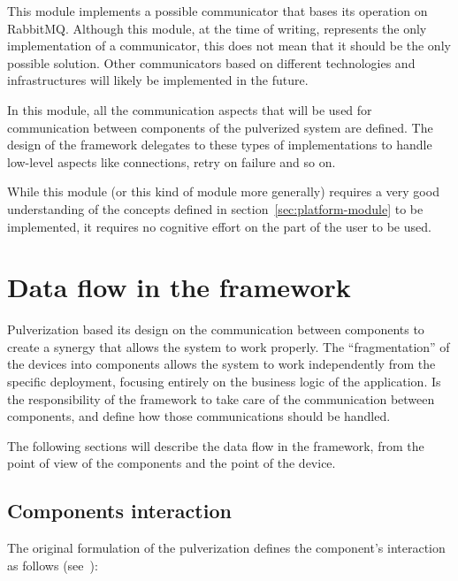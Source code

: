 This module implements a possible communicator that bases its operation on RabbitMQ. Although this module, at the time of writing, represents
the only implementation of a communicator, this does not mean that it should be the only possible solution.
Other communicators based on different technologies and infrastructures will likely be implemented in the future.

In this module, all the communication aspects that will be used for communication between components of the pulverized system are defined.
The design of the framework delegates to these types of implementations to handle low-level aspects like connections, retry on failure and so on.

While this module (or this kind of module more generally) requires a very good understanding of the concepts defined in
section~\ref{sec:platform-module} to be implemented, it requires no cognitive effort on the part of the user to be used.


\section{Data flow in the framework}
\label{sec:framework-data-flow}

Pulverization based its design on the communication between components to create a synergy that allows the system to work properly.
The ``fragmentation'' of the devices into components allows the system to work independently from the specific deployment, focusing entirely on
the business logic of the application.
Is the responsibility of the framework to take care of the communication between components, and define how those communications should be handled.

The following sections will describe the data flow in the framework, from the point of view of the components and the point of the device.

\subsection{Components interaction}
\label{sec:framework-components-interaction}

The original formulation of the pulverization defines the component's interaction as follows (see~):

